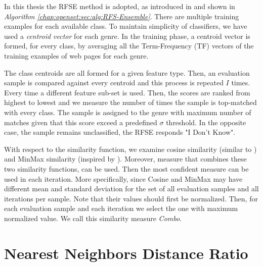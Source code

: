 \hfill

In this thesis the RFSE method is adopted, as introduced in \parencite{pritsos2013open} and shown in \textit{Algorithm \ref{chap:openset:sec:alg:RFS-Ensemble}}. There are multiple training examples for each available class. To maintain simplicity of classifiers, we have used a \textit{centroid vector} for each genre. In the training phase, a centroid vector is formed, for every class, by averaging all the Term-Frequency (TF) vectors of the training examples of web pages for each genre.

The class centroids are all formed for a given feature type. Then, an evaluation sample is compared against every centroid and this process is repeated $I$ times. Every time a different feature sub-set is used. Then, the scores are ranked from highest to lowest and we measure the number of times the sample is top-matched with every class. The sample is assigned to the genre with maximum number of matches given that this score exceed a predefined $\sigma$ threshold. In the opposite case, the sample remains unclassified, the RFSE responds "I Don't Know".

With respect to the similarity function, we examine cosine similarity (similar to \parencite{pritsos2013open}) and MinMax similarity (inspired by \parencite{koppel2014determining}). Moreover, measure that combines these two similarity functions, can be used. Then the most confident measure can be used in each iteration. More specifically, since Cosine and MinMax may have different mean and standard deviation for the set of all evaluation samples and all iterations per sample. Note that their values should first be normalized. Then, for each evaluation sample and each iteration we select the one with maximum normalized value. We call this similarity measure \textit{Combo}.

\section{Nearest Neighbors Distance Ratio}\label{chap:openset:sec:NNRD_Description}

